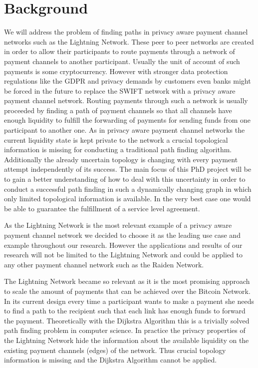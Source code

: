 \documentclass[a4paper]{paper}
\begin{document}
\section{Background}
We will address the problem of finding paths in privacy aware payment channel networks such as the Lightning Network.
These peer to peer networks are created in order to allow their participants to route payments through a network of payment channels to another participant.
Usually the unit of account of such payments is some cryptocurrency.
However with stronger data protection regulations like the GDPR and privacy demands by customers even banks might be forced in the future to replace the SWIFT network with a privacy aware payment channel network.
Routing payments through such a network is usually proceeded by finding a path of payment channels so that all channels have enough liquidity to fulfill the forwarding of payments for sending funds from one participant to another one.
As in privacy aware payment channel networks the current liquidity state is kept private to the network a crucial topological information is missing for conducting a traditional path finding algorithm. 
Additionally the already uncertain topology is changing with every payment attempt independently of its success.
The main focus of this PhD project will be to gain a better understanding of how to deal with this uncertainty in order to conduct a successful path finding in such a dynamically changing graph in which only limited topological information is available.
In the very best case one would be able to guarantee the fulfillment of a service level agreement.

As the Lightning Network is the most relevant example of a privacy aware payment channel network we decided to choose it as the leading use case and example throughout our research.
However the applications and results of our research will not be limited to the Lightning Network and could be applied to any other payment channel network such as the Raiden Network.

The Lightning Network became so relevant as it is the most promising approach to scale the amount of payments that can be achieved over the Bitcoin Network.
In its current design every time a participant wants to make a payment she needs to find a path to the recipient such that each link has enough funds to forward the payment.
Theoretically with the Dijkstra Algorithm this is a trivially solved path finding problem in computer science.
In practice the privacy properties of the Lightning Network hide the information about the available liquidity on the existing payment channels (edges) of the network.
Thus crucial topology information is missing and the Dijkstra Algorithm cannot be applied.
\end{document}
